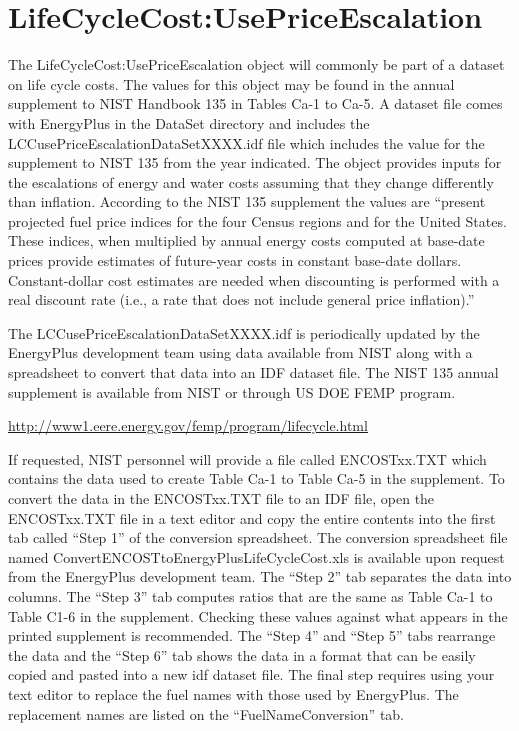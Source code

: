 \section{LifeCycleCost:UsePriceEscalation}\label{lifecyclecostusepriceescalation}

The LifeCycleCost:UsePriceEscalation object will commonly be part of a dataset on life cycle costs. The values for this object may be found in the annual supplement to NIST Handbook 135 in Tables Ca-1 to Ca-5. A dataset file comes with EnergyPlus in the DataSet directory and includes the LCCusePriceEscalationDataSetXXXX.idf file which includes the value for the supplement to NIST 135 from the year indicated. The object provides inputs for the escalations of energy and water costs assuming that they change differently than inflation. According to the NIST 135 supplement the values are ``present projected fuel price indices for the four Census regions and for the United States. These indices, when multiplied by annual energy costs computed at base-date prices provide estimates of future-year costs in constant base-date dollars. Constant-dollar cost estimates are needed when discounting is performed with a real discount rate (i.e., a rate that does not include general price inflation).''

The LCCusePriceEscalationDataSetXXXX.idf is periodically updated by the EnergyPlus development team using data available from NIST along with a spreadsheet to convert that data into an IDF dataset file. The NIST 135 annual supplement is available from NIST or through US DOE FEMP program.

\url{http://www1.eere.energy.gov/femp/program/lifecycle.html}

If requested, NIST personnel will provide a file called ENCOSTxx.TXT which contains the data used to create Table Ca-1 to Table Ca-5 in the supplement. To convert the data in the ENCOSTxx.TXT file to an IDF file, open the ENCOSTxx.TXT file in a text editor and copy the entire contents into the first tab called ``Step 1'' of the conversion spreadsheet. The conversion spreadsheet file named ConvertENCOSTtoEnergyPlusLifeCycleCost.xls is available upon request from the EnergyPlus development team. The ``Step 2'' tab separates the data into columns. The ``Step 3'' tab computes ratios that are the same as Table Ca-1 to Table C1-6 in the supplement. Checking these values against what appears in the printed supplement is recommended. The ``Step 4'' and ``Step 5'' tabs rearrange the data and the ``Step 6'' tab shows the data in a format that can be easily copied and pasted into a new idf dataset file. The final step requires using your text editor to replace the fuel names with those used by EnergyPlus. The replacement names are listed on the ``FuelNameConversion'' tab.

